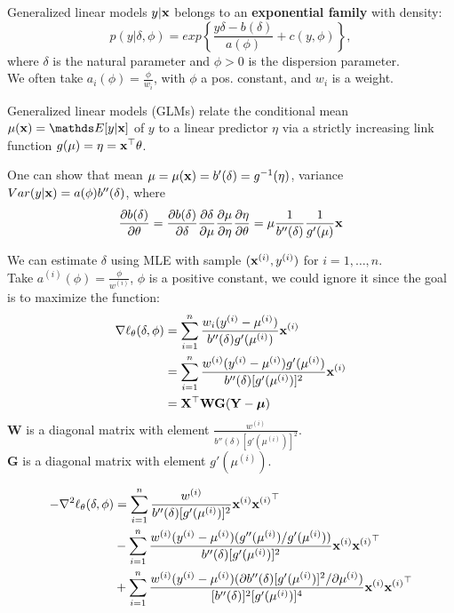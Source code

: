\documentclass[11pt,compress,t,notes=noshow, xcolor=table]{beamer}
\begin{document}
\begin{vbframe}{Generalized linear models}
$y|\mathbf{x}$ belongs to an \textbf{exponential family} with density:
$$ p(y|\delta, \phi) = exp \left\{ \frac{y\delta-b(\delta)}{a(\phi)} + c(y,\phi) \right\}, $$
where $\delta$ is the natural parameter and $\phi > 0$ is the dispersion parameter.\\
We often take $a_i(\phi) = \frac{\phi}{w_i}$, with $\phi$ a pos. constant, and $w_i$ is a weight.

\lz

Generalized linear models (GLMs) relate the conditional mean $\mu(\xv)=\E[y|\xv]$ of $y$ to a linear predictor $\eta$ via a 
strictly increasing link function $g(\mu)=\eta=\mathbf{x}^\top\theta$.\\

\lz

One can show that mean $\mu = \mu(\mathbf{x})=b'(\delta)=g^{-1}(\eta)$, variance $Var(y|\mathbf{x})=a(\phi)b''(\delta)$, where\\
$$\frac{\partial{b(\delta)}}{\partial{\theta}}
=\frac{\partial{b(\delta)}}{\partial{\delta}}\frac{\partial{\delta}}{\partial{\mu}}\frac{\partial{\mu}}{\partial{\eta}}\frac{\partial{\eta}}{\partial{\theta}}
=\mu \frac{1}{b''(\delta)} \frac{1}{g'(\mu)} \mathbf{x}$$

\framebreak
We can estimate $\delta$ using MLE with sample $(\mathbf{x}^{(i)},y^{(i)})$ for $i=1,\ldots,n$.\\
Take $a^{(i)}(\phi) = \frac{\phi}{w^{(i)}}$, $\phi$ is a positive constant, 
we could ignore it since the goal is to maximize the function:\\
\begin{align*}
\nabla \ell_{\theta}(\delta, \phi) &= \sum\limits_{i=1}^n \frac{w_i(y^{(i)}-\mu^{(i)})}{b''(\delta)g'(\mu^{(i)})}\mathbf{x}^{(i)}\\
 &= \sum\limits_{i=1}^n \frac{w^{(i)}(y^{(i)}-\mu^{(i)})g'(\mu^{(i)})}{b''(\delta)[g'(\mu^{(i)})]^2}\mathbf{x}^{(i)}\\
 &= \mathbf{X}^\top \mathbf{W} \mathbf{G} (\mathbf{Y}-\bm{\mu})
\end{align*}
\lz
$\mathbf{W}$ is a diagonal matrix with element $\frac{w^{(i)}}{b''(\delta)[g'(\mu^{(i)})]^2}$.\\
$\mathbf{G}$ is a diagonal matrix with element $g'(\mu^{(i)})$.\\

\framebreak

\begin{align*}
-\nabla^2 \ell_{\theta}(\delta, \phi)
  & = \sum\limits_{i=1}^n \frac{w^{(i)}}{b''(\delta)[g'(\mu^{(i)})]^2}\mathbf{x}^{(i)}{\mathbf{x}^{(i)}}^\top \\
  & - \sum\limits_{i=1}^n \frac{w^{(i)}(y^{(i)}-\mu^{(i)})(g''(\mu^{(i)})/g'(\mu^{(i)}))}{b''(\delta)[g'(\mu^{(i)})]^2}\mathbf{x}^{(i)}{\mathbf{x}^{(i)}}^\top \\ 
  & + \sum\limits_{i=1}^n \frac{w^{(i)}(y^{(i)}-\mu^{(i)})(\partial{b''(\delta)[g'(\mu^{(i)})]^2}/\partial{\mu^{(i)}})}{[b''(\delta)]^2[g'(\mu^{(i)})]^4}\mathbf{x}^{(i)}{\mathbf{x}^{(i)}}^\top
\end{align*}


\end{vbframe}
\end{document}
